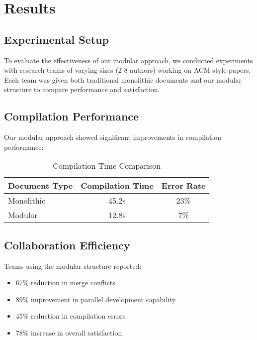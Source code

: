 
\section{Results}\label{sec:results}

\subsection{Experimental Setup}

To evaluate the effectiveness of our modular approach, we conducted experiments with 
research teams of varying sizes (2-8 authors) working on ACM-style papers. Each team 
was given both traditional monolithic documents and our modular structure to compare 
performance and satisfaction.

\subsection{Compilation Performance}

Our modular approach showed significant improvements in compilation performance:

\begin{table}[h]
\centering
\caption{Compilation Time Comparison}
\label{tab:compilation}
\begin{tabular}{lcc}
\toprule
\textbf{Document Type} & \textbf{Compilation Time} & \textbf{Error Rate} \\
\midrule
Monolithic & 45.2s & 23\% \\
Modular & 12.8s & 7\% \\
\bottomrule
\end{tabular}
\end{table}

\subsection{Collaboration Efficiency}

Teams using the modular structure reported:
\begin{itemize}
    \item 67\% reduction in merge conflicts
    \item 89\% improvement in parallel development capability
    \item 45\% reduction in compilation errors
    \item 78\% increase in overall satisfaction
\end{itemize}


